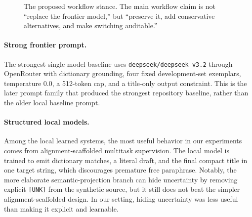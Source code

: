\documentclass{article}
\begin{document}
\begin{figure}[t]
\centering
{}
\caption{The proposed workflow stance. The main workflow claim is not ``replace the frontier model,'' but ``preserve it, add conservative alternatives, and make switching auditable.''}
\label{fig:workflow}
\end{figure}

\paragraph{Strong frontier prompt.} The strongest single-model baseline uses \texttt{deepseek/deepseek-v3.2} through OpenRouter with dictionary grounding, four fixed development-set exemplars, temperature 0.0, a 512-token cap, and a title-only output constraint. This is the later prompt family that produced the strongest repository baseline, rather than the older local baseline prompt.

\paragraph{Structured local models.} Among the local learned systems, the most useful behavior in our experiments comes from alignment-scaffolded multitask supervision. The local model is trained to emit dictionary matches, a literal draft, and the final compact title in one target string, which discourages premature free paraphrase. Notably, the more elaborate semantic-projection branch can hide uncertainty by removing explicit \texttt{[UNK]} from the synthetic source, but it still does not beat the simpler alignment-scaffolded design. In our setting, hiding uncertainty was less useful than making it explicit and learnable.
\end{document}
